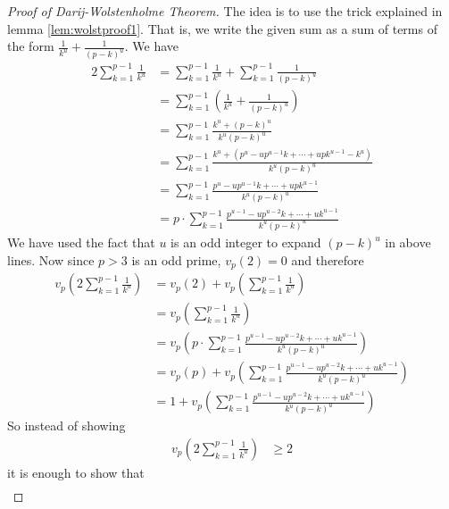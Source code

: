 \documentclass{subfile}
\begin{document}
	\begin{proof}[Proof of Darij-Wolstenholme Theorem]
		The idea is to use the trick explained in lemma \eqref{lem:wolstproof1}. That is, we write the given sum as a sum of terms of the form $\frac{1}{k^u}+\frac{1}{(p-k)^u}$. We have
		\begin{align*}
			2\sum_{k = 1}^{p - 1}\frac {1}{k^{u}}
				&= \sum_{k = 1}^{p - 1}\frac {1}{k^{u}} + \sum_{k = 1}^{p - 1}\frac {1}{\left(p - k\right)^{u}}\\
				&= \sum_{k = 1}^{p - 1}\left(\frac {1}{k^{u}} + \frac {1}{\left(p - k\right)^{u}}\right) \\
				&= \sum_{k = 1}^{p - 1}\frac {k^{u} + \left(p - k\right)^{u}}{k^{u}\left(p - k\right)^{u}}\\
				&=\sum_{k = 1}^{p - 1}\frac {k^{u} + \left(p^{u} - up^{u - 1}k+ \cdots + upk^{u - 1} - k^{u}\right)}{k^{u}\left(p - k\right)^{u}} \\
				&= \sum_{k = 1}^{p - 1}\frac {p^{u} - up^{u - 1}k + \cdots + upk^{u - 1}}{k^{u}\left(p - k\right)^{u}}\\
				&=p \cdot \sum_{k = 1}^{p - 1}\frac {p^{u - 1} - up^{u - 2}k+\cdots + uk^{u - 1}}{k^{u}\left(p - k\right)^{u}}
		\end{align*}
		We have used the fact that $u$ is an odd integer to expand $(p-k)^u$ in above lines. Now since $p>3$ is an odd prime, $v_p(2)=0$ and therefore
			\begin{align*}
				v_{p}\left(2\sum_{k = 1}^{p - 1}\frac {1}{k^{u}}\right)
					&= v_{p}\left(2\right) + v_{p}\left(\sum_{k = 1}^{p - 1}\frac {1}{k^{u}}\right)\\
					& = v_{p}\left(\sum_{k = 1}^{p - 1}\frac {1}{k^{u}}\right)\\
					&=v_{p}\left(p \cdot \sum_{k = 1}^{p - 1}\frac {p^{u - 1} - up^{u - 2}k+\cdots + uk^{u - 1}}{k^{u}\left(p - k\right)^{u}}\right)\\
					&=v_{p}\left(p\right) + v_{p}\left(\sum_{k = 1}^{p - 1}\frac {p^{u - 1} - up^{u - 2}k+\cdots + uk^{u - 1}}{k^{u}\left(p - k\right)^{u}}\right)\\
					&=1+v_{p}\left(\sum_{k = 1}^{p - 1}\frac {p^{u - 1} - up^{u - 2}k+\cdots + uk^{u - 1}}{k^{u}\left(p - k\right)^{u}}\right)
			\end{align*}
		So instead of showing
			\begin{align*}
				v_{p}\left(2\sum_{k = 1}^{p - 1}\frac {1}{k^{u}}\right)
					& \geq 2
			\end{align*}
		it is enough to show that
		\begin{align*}

\end{align*}
\end{proof}
\end{document}
